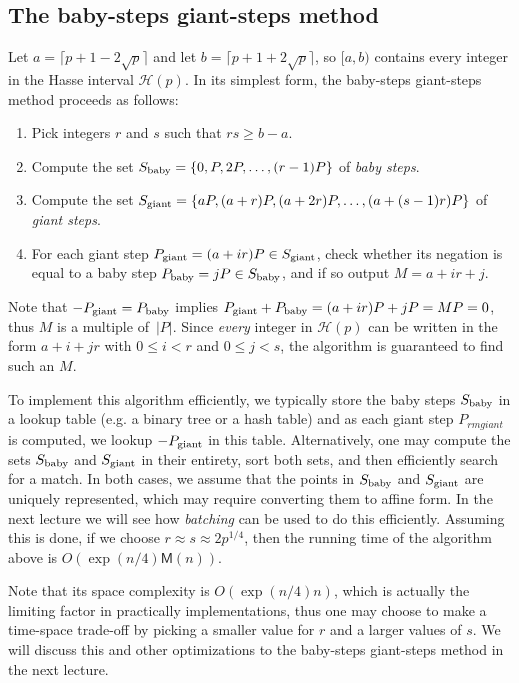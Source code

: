 \subsection{The baby-steps giant-steps method}
Let $a=\lceil p+1-2\sqrt{p}\rceil$ and let $b=\lceil p+1+2\sqrt{p}\rceil$, so $[a,b)$ contains every integer in the Hasse interval $\mathcal{H}(p)$.
In its simplest form, the baby-steps giant-steps method proceeds as follows:
\begin{enumerate}
\item Pick integers $r$ and $s$ such that $rs \ge b-a$.
\item Compute the set $S_{\rm baby}=\{0,P,2P,\ldots,(r-1)P\}$ of \emph{baby steps}.
\item Compute the set $S_{\rm giant}=\{aP,(a+r)P, (a+2r)P,\ldots,(a+(s-1)r)P\}$ of \emph{giant steps}.
\item For each giant step $P_{\rm giant}=(a+ir)P\in S_{\rm giant}$, check whether its negation is equal to a baby step $P_{\rm baby}=jP\in S_{\rm baby}$, and if so output $M=a+ir+j$.
\end{enumerate}

Note that $-P_{\rm giant}=P_{\rm baby}$ implies $P_{\rm giant}+P_{\rm baby}=(a+ir)P+jP=MP=0$, thus $M$ is a multiple of~$|P|$.
Since \emph{every} integer in $\mathcal{H}(p)$ can be written in the form $a+i+jr$ with $0\le i < r$ and $0\le j < s$, the algorithm is guaranteed to find such an $M$.

To implement this algorithm efficiently, we typically store the baby steps $S_{\rm baby}$ in a lookup table (e.g. a binary tree or a hash table) and as each giant step $P_{rm giant}$ is computed, we lookup $-P_{\rm giant}$ in this table.  Alternatively, one may compute the sets $S_{\rm baby}$ and $S_{\rm giant}$ in their entirety, sort both sets, and then efficiently search for a match.
In both cases, we assume that the points in $S_{\rm baby}$ and $S_{\rm giant}$ are uniquely represented, which may require converting them to affine form.
In the next lecture we will see how \emph{batching} can be used to do this efficiently.
Assuming this is done, if we choose $r\approx s \approx 2p^{1/4}$, then the running time of the algorithm above is $O(\exp(n/4)\textsf{M}(n))$.

Note that its space complexity is $O(\exp(n/4)n)$, which is actually the limiting factor in practically implementations, thus one may choose to make a time-space trade-off by picking a smaller value for $r$ and a larger values of $s$.
We will discuss this and other optimizations to the baby-steps giant-steps method in the next lecture.

